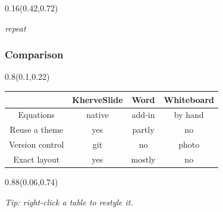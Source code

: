\documentclass[aspectratio=169]{beamer}
\begin{document}
\begin{frame}[t]
\begin{textblock}{0.16}(0.42,0.72)
{\centering\fontsize{12}{14}\selectfont \textcolor[HTML]{AC145A}{\textit{repeat}}\par}
\end{textblock}
\end{frame}

\begin{frame}[t]
  \frametitle{Comparison}

\begin{textblock}{0.8}(0.1,0.22)
{\setlength{\arrayrulewidth}{0.8pt} \fontsize{15}{18}\selectfont \begin{tabular}{|c|c|c|c|}
\hline
  \rowcolor{ksTH500778}\textcolor{ksTFFFFFFF}{\textbf{}} & \textcolor{ksTFFFFFFF}{\textbf{KherveSlide}} & \textcolor{ksTFFFFFFF}{\textbf{Word}} & \textcolor{ksTFFFFFFF}{\textbf{Whiteboard}} \\
\hline
  Equations & native & add-in & by hand \\
\hline
  \rowcolor{ksTSF3E9F7}Reuse a theme & yes & partly & no \\
\hline
  Version control & git & no & photo \\
\hline
  \rowcolor{ksTSF3E9F7}Exact layout & yes & mostly & no \\
\hline
\end{tabular}}
\end{textblock}

\begin{textblock}{0.88}(0.06,0.74)
{\centering\fontsize{13}{16}\selectfont \textcolor[HTML]{666666}{\textit{Tip: right-click a table to restyle it.}}\par}
\end{textblock}
\end{frame}
\end{document}
